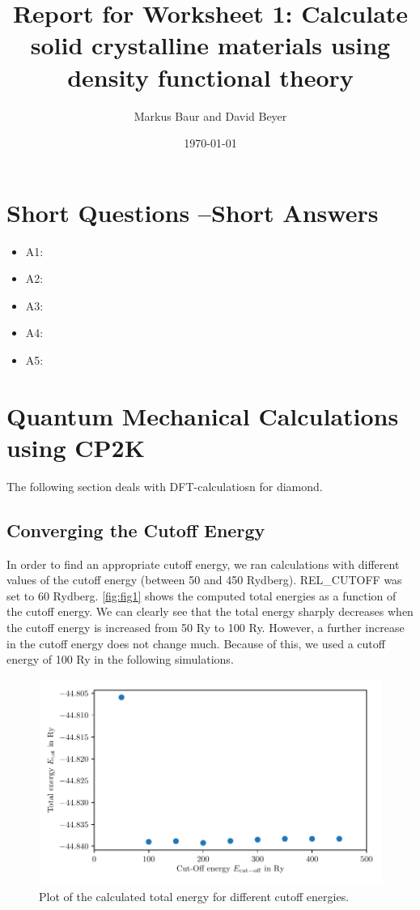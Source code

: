 \documentclass[a4paper,10pt,bibtotoc]{scrartcl}
\begin{document}
\titlehead{Simulation Methods in Physics II \hfill SS 2020}
\title{Report for Worksheet 1: Calculate solid crystalline materials using density functional theory}
\author{Markus Baur and David Beyer}
\date{\today}
\maketitle

\tableofcontents

\section{Short Questions --Short Answers}
\begin{itemize}
 \item A1: 
 \item A2:
 \item A3:
 \item A4:
 \item A5:
\end{itemize}


\section{Quantum Mechanical Calculations using CP2K}
The following section deals with DFT-calculatiosn for diamond.

\subsection{Converging the Cutoff Energy}
In order to find an appropriate cutoff energy, we ran calculations with different values of the cutoff energy (between 50 and 450 Rydberg). REL\_CUTOFF was set to 60 Rydberg. \autoref{fig:fig1} shows the computed total energies as a function of the cutoff energy. We can clearly see that the total energy sharply decreases when the cutoff energy is increased from 50 Ry to 100 Ry. However, a further increase in the cutoff energy does not change much. Because of this, we used a cutoff energy of 100 Ry in the following simulations.

\begin{figure}[h]
\centering
 \includegraphics[width=\textwidth]{Figure_cutoff_energy.pdf}
 \caption{Plot of the calculated total energy for different cutoff energies.}
 \label{fig:fig1}
\end{figure}
\end{document}
